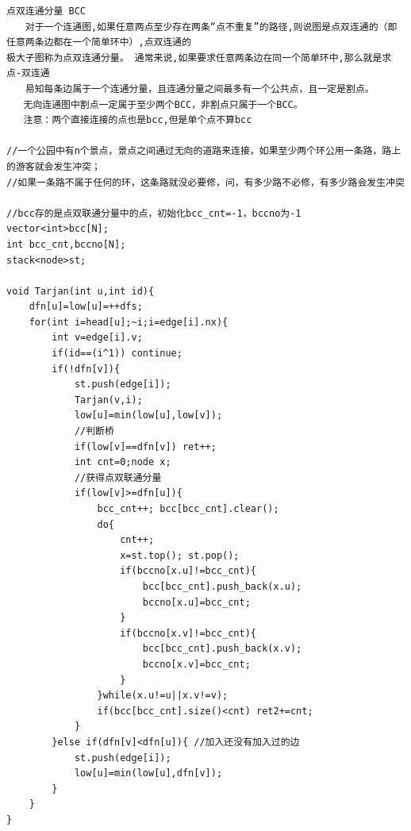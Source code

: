 \documentclass[twoside]{article}
\begin{document}
\begin{lstlisting}
点双连通分量 BCC
　　对于一个连通图,如果任意两点至少存在两条“点不重复”的路径,则说图是点双连通的（即任意两条边都在一个简单环中）,点双连通的
极大子图称为点双连通分量。 通常来说,如果要求任意两条边在同一个简单环中,那么就是求点-双连通
　　易知每条边属于一个连通分量，且连通分量之间最多有一个公共点，且一定是割点。
   无向连通图中割点一定属于至少两个BCC，非割点只属于一个BCC。
   注意：两个直接连接的点也是bcc,但是单个点不算bcc

//一个公园中有n个景点，景点之间通过无向的道路来连接，如果至少两个环公用一条路，路上的游客就会发生冲突；
//如果一条路不属于任何的环，这条路就没必要修，问，有多少路不必修，有多少路会发生冲突

//bcc存的是点双联通分量中的点，初始化bcc_cnt=-1，bccno为-1
vector<int>bcc[N];
int bcc_cnt,bccno[N];
stack<node>st;

void Tarjan(int u,int id){
    dfn[u]=low[u]=++dfs;
    for(int i=head[u];~i;i=edge[i].nx){
        int v=edge[i].v;
        if(id==(i^1)) continue;
        if(!dfn[v]){
            st.push(edge[i]);
            Tarjan(v,i);
            low[u]=min(low[u],low[v]);
            //判断桥
            if(low[v]==dfn[v]) ret++;
            int cnt=0;node x;
            //获得点双联通分量
            if(low[v]>=dfn[u]){
                bcc_cnt++; bcc[bcc_cnt].clear();
                do{
                    cnt++;
                    x=st.top(); st.pop();
                    if(bccno[x.u]!=bcc_cnt){
                        bcc[bcc_cnt].push_back(x.u);
                        bccno[x.u]=bcc_cnt;
                    }
                    if(bccno[x.v]!=bcc_cnt){
                        bcc[bcc_cnt].push_back(x.v);
                        bccno[x.v]=bcc_cnt;
                    }
                }while(x.u!=u||x.v!=v);
                if(bcc[bcc_cnt].size()<cnt) ret2+=cnt;
            }
        }else if(dfn[v]<dfn[u]){ //加入还没有加入过的边
            st.push(edge[i]);
            low[u]=min(low[u],dfn[v]);
        }
    }
}


\end{lstlisting}
\end{document}
